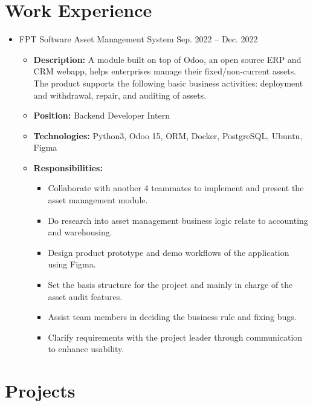 \documentclass[11pt,a4paper,sans]{moderncv}        %
\begin{document}
\section{Work Experience}
\begin{itemize}
\item{
\cventry
{}
{FPT Software}
{Asset Management System} 
{Sep. 2022 -- Dec. 2022}
{}
{
\begin{itemize}
\item \textbf{Description:} A module built on top of Odoo, an open source ERP and CRM webapp, helps enterprises manage their fixed/non-current assets. The product supports the following basic business activities: deployment and withdrawal, repair, and auditing of assets.
\vspace{1pt}
\item \textbf{Position:} Backend Developer Intern
\vspace{1pt}
\item \textbf{Technologies:} Python3, Odoo 15, ORM, Docker, PostgreSQL, Ubuntu, Figma
\vspace{1pt}
\item \textbf{Responsibilities:}
\begin{itemize}
\item Collaborate with another 4 teammates to implement and present the asset management module.
\vspace{1pt}
\item Do research into asset management business logic relate to accounting and warehousing.
\vspace{1pt}
\item Design product prototype and demo workflows of the application using Figma.
\vspace{1pt}
\item Set the basis structure for the project and mainly in charge of the asset audit features.
\item Assist team members in deciding the business rule and fixing bugs.
\vspace{1pt}
\item Clarify requirements with the project leader through communication to enhance usability.
\end{itemize}
\end{itemize}
}}

\end{itemize}


\vspace{-6pt}
\section{Projects}
\end{document}
